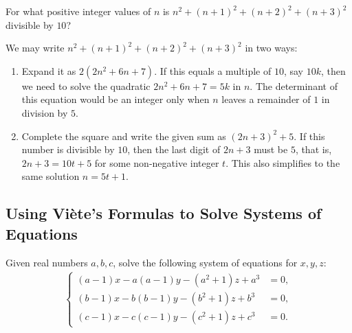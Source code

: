 \documentclass[12pt,a4paper]{memoir}
\theoremstyle{definition}
\begin{document}
\begin{question}
	For what positive integer values of $n$ is $n^2+(n+1)^2+(n+2)^2+(n+3)^2$ divisible by $10$?
\end{question}

\begin{solution}
	We may write $n^2+(n+1)^2+(n+2)^2+(n+3)^2$ in two ways:
	\begin{enumerate}
		\item Expand it as $2(2n^2+6n+7)$. If this equals a multiple of $10$, say $10k$, then we need to solve the quadratic $2n^2+6n+7=5k$ in $n$. The determinant of this equation would be an integer only when $n$ leaves a remainder of $1$ in division by $5$.
		\item Complete the square and write the given sum as $(2n+3)^2+5$. If this number is divisible by $10$, then the last digit of $2n+3$ must be $5$, that is, $2n+3=10t+5$ for some non-negative integer $t$. This also simplifies to the same solution $n=5t+1$.
	\end{enumerate}
\end{solution}

\subsection{Using Viète's Formulas to Solve Systems of Equations}

\begin{question}
	Given real numbers $a,b,c$, solve the following system of equations for $x,y,z$:
	\begin{align*}
		\begin{cases}
			(a-1)x-a(a-1)y-(a^2+1)z+a^3 &= 0,\\(b-1)x-b(b-1)y-(b^2+1)z+b^3 &= 0,\\(c-1)x-c(c-1)y-(c^2+1)z+c^3 &= 0.
		\end{cases}
	\end{align*}
\end{question}
\end{document}
